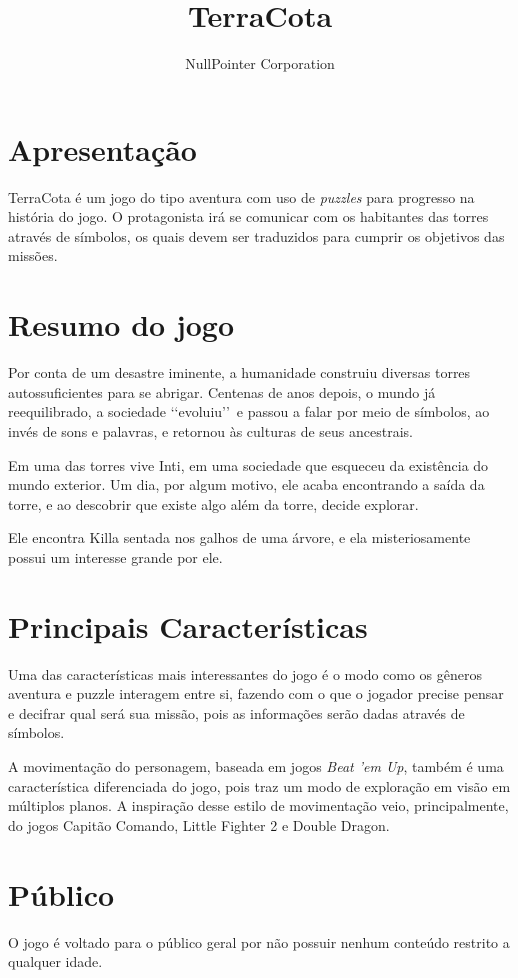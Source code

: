 \documentclass[11pt]{article}
\begin{document}
\title{TerraCota}
\author{NullPointer Corporation}
\date{}
\maketitle

\newpage

\tableofcontents
\newpage
\section{Apresentação}
TerraCota é um jogo do tipo aventura com uso de \textit{puzzles} para progresso na história do jogo.  O protagonista irá se comunicar com os habitantes das torres através de símbolos, os quais devem ser traduzidos para cumprir os objetivos das missões.

\section{Resumo do jogo}
Por conta de um desastre iminente, a humanidade construiu diversas torres autossuficientes para se abrigar.
Centenas de anos depois, o mundo já reequilibrado, a sociedade \lq\lq evoluiu\rq\rq\ e passou a falar por meio de símbolos, ao invés de sons e palavras, e retornou às culturas de seus ancestrais.

Em uma das torres vive Inti, em uma sociedade que esqueceu da existência do mundo exterior.  Um dia, por algum motivo, ele acaba encontrando a saída da torre, e ao descobrir que existe algo além da torre, decide explorar.

Ele encontra Killa sentada nos galhos de uma árvore, e ela misteriosamente possui um interesse grande por ele.

\section{Principais Características}
Uma das características mais interessantes do jogo é o modo como os gêneros aventura e puzzle interagem entre si, fazendo com o que o jogador precise pensar e decifrar qual será sua missão, pois as informações serão dadas através de símbolos.

A movimentação do personagem, baseada em jogos \textit{Beat 'em Up}, também é uma característica diferenciada do jogo, pois traz um modo de exploração em visão em múltiplos planos. A inspiração desse estilo de movimentação veio, principalmente, do jogos Capitão Comando, Little Fighter 2 e Double Dragon.

\section{Público}
O jogo é voltado para o público geral por não possuir nenhum conteúdo restrito a qualquer idade.
\end{document}
